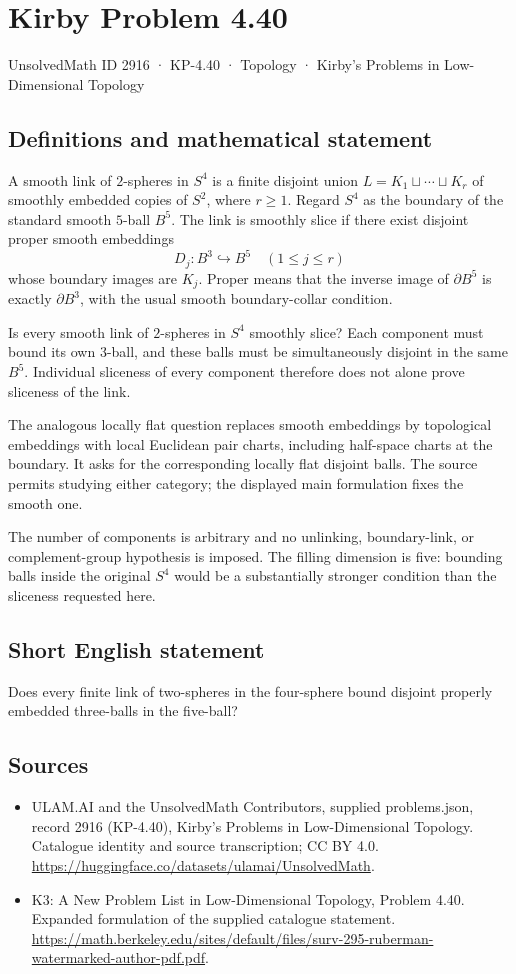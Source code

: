 \documentclass[11pt,a4paper]{article}
\begin{document}
\section*{Kirby Problem 4.40}\label{2916}
{\small UnsolvedMath ID 2916 · KP-4.40 · Topology · Kirby's Problems in Low-Dimensional Topology}
\subsection{Definitions and mathematical statement}
A smooth link of $2$-spheres in $S^4$ is a finite disjoint union
$L=K_1\sqcup\cdots\sqcup K_r$ of smoothly embedded copies of $S^2$,
where $r\ge1$. Regard $S^4$ as the boundary of the standard smooth
$5$-ball $B^5$. The link is smoothly slice if there exist disjoint
proper smooth embeddings
\[
 D_j:B^3\hookrightarrow B^5\quad(1\le j\le r)
\]
whose boundary images are $K_j$. Proper means that the inverse image
of $\partial B^5$ is exactly $\partial B^3$, with the usual smooth
boundary-collar condition.

Is every smooth link of $2$-spheres in $S^4$ smoothly slice? Each
component must bound its own $3$-ball, and these balls must be
simultaneously disjoint in the same $B^5$. Individual sliceness of
every component therefore does not alone prove sliceness of the link.

The analogous locally flat question replaces smooth embeddings by
topological embeddings with local Euclidean pair charts, including
half-space charts at the boundary. It asks for the corresponding
locally flat disjoint balls. The source permits studying either
category; the displayed main formulation fixes the smooth one.

The number of components is arbitrary and no unlinking, boundary-link,
or complement-group hypothesis is imposed. The filling dimension is
five: bounding balls inside the original $S^4$ would be a substantially
stronger condition than the sliceness requested here.
\subsection{Short English statement}
Does every finite link of two-spheres in the four-sphere bound disjoint properly embedded three-balls in the five-ball?
\subsection{Sources}
\begin{itemize}
\item[S1] ULAM.AI and the UnsolvedMath Contributors, supplied problems.json, record 2916 (KP-4.40), Kirby's Problems in Low-Dimensional Topology. Catalogue identity and source transcription; CC BY 4.0.
\url{https://huggingface.co/datasets/ulamai/UnsolvedMath}.
\item[S2] K3: A New Problem List in Low-Dimensional Topology, Problem 4.40. Expanded formulation of the supplied catalogue statement.
\url{https://math.berkeley.edu/sites/default/files/surv-295-ruberman-watermarked-author-pdf.pdf}.
\end{itemize}
\end{document}
